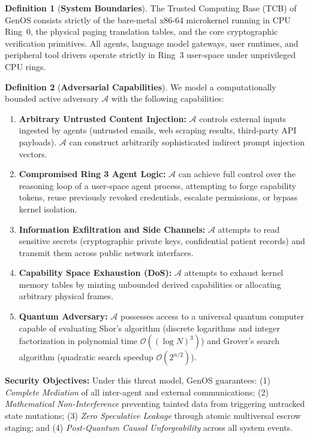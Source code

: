 \documentclass[10pt,journal,compsoc]{IEEEtran}
\theoremstyle{definition}
\newtheorem{definition}{Definition}
\begin{document}
\begin{definition}[\textbf{System Boundaries}]
The Trusted Computing Base (TCB) of GenOS consists strictly of the bare-metal x86-64 microkernel running in CPU Ring~0, the physical paging translation tables, and the core cryptographic verification primitives. All agents, language model gateways, user runtimes, and peripheral tool drivers operate strictly in Ring~3 user-space under unprivileged CPU rings.
\end{definition}

\begin{definition}[\textbf{Adversarial Capabilities}]
We model a computationally bounded active adversary $\mathcal{A}$ with the following capabilities:
\begin{enumerate}
    \item \textbf{Arbitrary Untrusted Content Injection:} $\mathcal{A}$ controls external inputs ingested by agents (untrusted emails, web scraping results, third-party API payloads). $\mathcal{A}$ can construct arbitrarily sophisticated indirect prompt injection vectors.
    \item \textbf{Compromised Ring 3 Agent Logic:} $\mathcal{A}$ can achieve full control over the reasoning loop of a user-space agent process, attempting to forge capability tokens, reuse previously revoked credentials, escalate permissions, or bypass kernel isolation.
    \item \textbf{Information Exfiltration and Side Channels:} $\mathcal{A}$ attempts to read sensitive secrets (cryptographic private keys, confidential patient records) and transmit them across public network interfaces.
    \item \textbf{Capability Space Exhaustion (DoS):} $\mathcal{A}$ attempts to exhaust kernel memory tables by minting unbounded derived capabilities or allocating arbitrary physical frames.
    \item \textbf{Quantum Adversary:} $\mathcal{A}$ possesses access to a universal quantum computer capable of evaluating Shor's algorithm (discrete logarithms and integer factorization in polynomial time $\mathcal{O}((\log N)^3)$) and Grover's search algorithm (quadratic search speedup $\mathcal{O}(2^{n/2})$).
\end{enumerate}
\end{definition}

\textbf{Security Objectives:} Under this threat model, GenOS guarantees: (1) \textit{Complete Mediation} of all inter-agent and external communications; (2) \textit{Mathematical Non-Interference} preventing tainted data from triggering untracked state mutations; (3) \textit{Zero Speculative Leakage} through atomic multiversal escrow staging; and (4) \textit{Post-Quantum Causal Unforgeability} across all system events.
\end{document}
